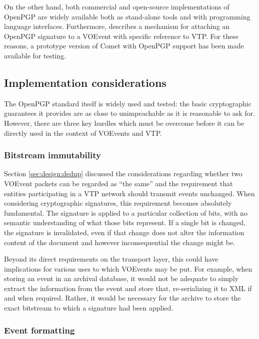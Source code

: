 \documentclass[5p,authoryear]{elsarticle}
\begin{document}
On the other hand, both commercial and open-source implementations of OpenPGP
are widely available both as stand-alone tools and with programming language
interfaces. Furthermore, \citet{Denny:2008} describes a mechanism for attaching
an OpenPGP signature to a VOEvent with specific reference to VTP. For these
reasons, a prototype version of Comet with OpenPGP support has been made
available for testing.

\subsection{Implementation considerations}

The OpenPGP standard itself is widely used and tested: the basic cryptographic
guarantees it provides are as close to unimpeachable as it is reasonable to
ask for. However, there are three key hurdles which must be overcome before it
can be directly used in the context of VOEvents and VTP.

\subsubsection{Bitstream immutability}

Section \ref{sec:design:dedup} discussed the considerations regarding whether
two VOEvent packets can be regarded as ``the same'' and the requirement that
entities participating in a VTP network should transmit events unchanged. When
considering cryptographic signatures, this requirement becomes absolutely
fundamental. The signature is applied to a particular collection of bits, with
no semantic understanding of what those bits represent. If a single bit is
changed, the signature is invalidated, even if that change does not alter the
information content of the document and however inconsequential the change
might be.

Beyond its direct requirements on the transport layer, this could have
implications for various uses to which VOEvents may be put. For example, when
storing an event in an archival database, it would not be adequate to simply
extract the information from the event and store that, re-serializing it to
XML if and when required. Rather, it would be necessary for the archive to
store the exact bitstream to which a signature had been applied.

\subsubsection{Event formatting}
\end{document}
